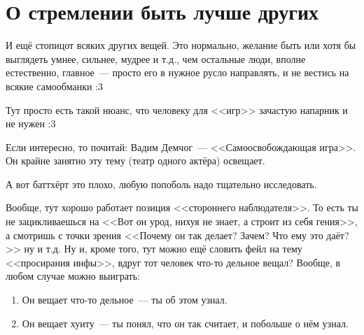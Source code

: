 \documentclass[a5paper,12pt,twoside]{memoir}
\begin{document}
\section{О стремлении быть лучше других}

\medskip
И ещё стопицот всяких других вещей. Это нормально, желание быть или хотя бы выглядеть умнее, сильнее, мудрее и т.д., чем остальные люди, вполне естественно, главное~--- просто его в нужное русло направлять, и не вестись на всякие самообманки :3 

Тут просто есть такой нюанс, что человеку для <<игр>> зачастую напарник и не нужен :3 

Если интересно, то почитай: Вадим Демчог~--- <<Самоосвобождающая игра>>. Он крайне занятно эту тему (театр одного актёра) освещает. 

А вот баттхёрт это плохо, любую попоболь надо тщательно исследовать.
 
Вообще, тут хорошо работает позиция <<стороннего наблюдателя>>. То есть ты не зацикливаешься на <<Вот он урод, нихуя не знает, а строит из себя гения>>, а смотришь с точки зрения <<Почему он так делает? Зачем? Что ему это даёт?>> ну и т.д. Ну и, кроме того, тут можно ещё словить фейл на тему <<просирания инфы>>, вдруг тот человек что-то дельное вещал? Вообще, в любом случае можно выиграть:
\begin{enumerate}
\item Он вещает что-то дельное~--- ты об этом узнал.
\item Он вещает хуиту~--- ты понял, что он так считает, и побольше о нём узнал. 
\end{enumerate}
\end{document}
